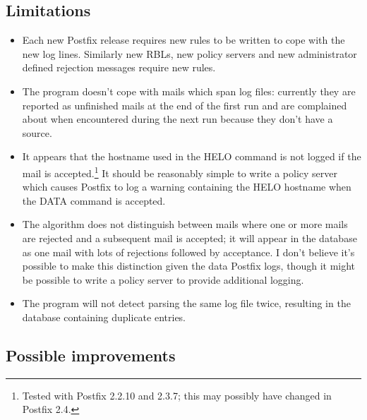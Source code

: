 \documentclass[a4paper,12pt,draft]{article}
\begin{document}
\subsection{Limitations}

\begin{itemize}

    \item Each new Postfix release requires new rules to be written to cope
        with the new log lines.  Similarly new RBLs, new policy servers and
        new administrator defined rejection messages require new rules.

    \item The program doesn't cope with mails which span log files:
        currently they are reported as unfinished mails at the end of the
        first run and are complained about when encountered during the next
        run because they don't have a source.

    \item It appears that the hostname used in the HELO command is not
        logged if the mail is accepted.\footnote{Tested with Postfix 2.2.10
        and 2.3.7; this may possibly have changed in Postfix 2.4.}  It
        should be reasonably simple to write a policy server which causes
        Postfix to log a warning containing the HELO hostname when the DATA
        command is accepted.

    \item The algorithm does not distinguish between mails where one or
        more mails are rejected and a subsequent mail is accepted; it will
        appear in the database as one mail with lots of rejections followed
        by acceptance.  I don't believe it's possible to make this
        distinction given the data Postfix logs, though it might be
        possible to write a policy server to provide additional
        logging.

    \item The program will not detect parsing the same log file twice,
        resulting in the database containing duplicate entries.

\end{itemize}

\subsection{Possible improvements}
\end{document}
